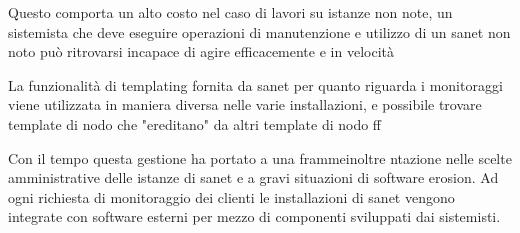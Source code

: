 Questo comporta un alto costo nel caso di lavori su istanze non note, un sistemista che deve eseguire operazioni di manutenzione e utilizzo di un sanet non noto può ritrovarsi incapace di agire efficacemente e in velocità

La funzionalità di templating fornita da sanet per quanto riguarda i monitoraggi viene utilizzata in maniera diversa nelle varie installazioni, e possibile trovare template di nodo che "ereditano" da altri template di nodo  ff





Con il tempo questa gestione ha portato a una frammeinoltre ntazione nelle scelte amministrative delle istanze di sanet e a gravi situazioni di software erosion. Ad ogni richiesta di monitoraggio dei clienti le installazioni di sanet vengono integrate con software esterni per mezzo di componenti sviluppati dai sistemisti.
%
%
%
%
%
